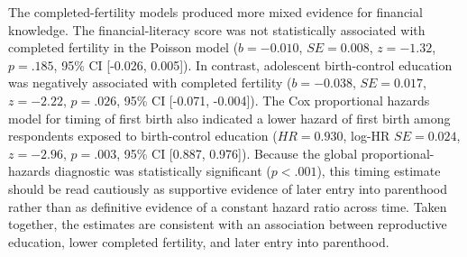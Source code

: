 \documentclass[12pt]{article}
\begin{document}
The completed-fertility models produced more mixed evidence for financial knowledge. The financial-literacy score was not statistically associated with completed fertility in the Poisson model ($b = -0.010$, $SE = 0.008$, $z = -1.32$, $p = .185$, 95\% CI [-0.026, 0.005]). In contrast, adolescent birth-control education was negatively associated with completed fertility ($b = -0.038$, $SE = 0.017$, $z = -2.22$, $p = .026$, 95\% CI [-0.071, -0.004]). The Cox proportional hazards model for timing of first birth also indicated a lower hazard of first birth among respondents exposed to birth-control education ($HR = 0.930$, log-HR $SE = 0.024$, $z = -2.96$, $p = .003$, 95\% CI [0.887, 0.976]). Because the global proportional-hazards diagnostic was statistically significant ($p < .001$), this timing estimate should be read cautiously as supportive evidence of later entry into parenthood rather than as definitive evidence of a constant hazard ratio across time. Taken together, the estimates are consistent with an association between reproductive education, lower completed fertility, and later entry into parenthood.
\end{document}
